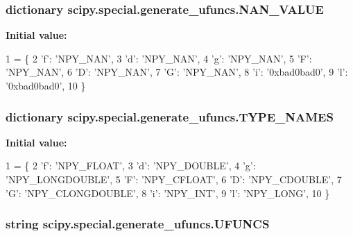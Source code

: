 \subsubsection[{N\+A\+N\+\_\+\+V\+A\+L\+U\+E}]{\setlength{\rightskip}{0pt plus 5cm}dictionary scipy.\+special.\+generate\+\_\+ufuncs.\+N\+A\+N\+\_\+\+V\+A\+L\+U\+E}\label{namespacescipy_1_1special_1_1generate__ufuncs_ae8498267d11764ae7751c668923040bf}
{\bfseries Initial value\+:}
\begin{DoxyCode}
1 = \{
2     \textcolor{stringliteral}{'f'}: \textcolor{stringliteral}{'NPY\_NAN'},
3     \textcolor{stringliteral}{'d'}: \textcolor{stringliteral}{'NPY\_NAN'},
4     \textcolor{stringliteral}{'g'}: \textcolor{stringliteral}{'NPY\_NAN'},
5     \textcolor{stringliteral}{'F'}: \textcolor{stringliteral}{'NPY\_NAN'},
6     \textcolor{stringliteral}{'D'}: \textcolor{stringliteral}{'NPY\_NAN'},
7     \textcolor{stringliteral}{'G'}: \textcolor{stringliteral}{'NPY\_NAN'},
8     \textcolor{stringliteral}{'i'}: \textcolor{stringliteral}{'0xbad0bad0'},
9     \textcolor{stringliteral}{'l'}: \textcolor{stringliteral}{'0xbad0bad0'},
10 \}
\end{DoxyCode}
\hypertarget{namespacescipy_1_1special_1_1generate__ufuncs_a800d81e3775d7c22733667b87973e576}{}
\subsubsection[{T\+Y\+P\+E\+\_\+\+N\+A\+M\+E\+S}]{\setlength{\rightskip}{0pt plus 5cm}dictionary scipy.\+special.\+generate\+\_\+ufuncs.\+T\+Y\+P\+E\+\_\+\+N\+A\+M\+E\+S}\label{namespacescipy_1_1special_1_1generate__ufuncs_a800d81e3775d7c22733667b87973e576}
{\bfseries Initial value\+:}
\begin{DoxyCode}
1 = \{
2     \textcolor{stringliteral}{'f'}: \textcolor{stringliteral}{'NPY\_FLOAT'},
3     \textcolor{stringliteral}{'d'}: \textcolor{stringliteral}{'NPY\_DOUBLE'},
4     \textcolor{stringliteral}{'g'}: \textcolor{stringliteral}{'NPY\_LONGDOUBLE'},
5     \textcolor{stringliteral}{'F'}: \textcolor{stringliteral}{'NPY\_CFLOAT'},
6     \textcolor{stringliteral}{'D'}: \textcolor{stringliteral}{'NPY\_CDOUBLE'},
7     \textcolor{stringliteral}{'G'}: \textcolor{stringliteral}{'NPY\_CLONGDOUBLE'},
8     \textcolor{stringliteral}{'i'}: \textcolor{stringliteral}{'NPY\_INT'},
9     \textcolor{stringliteral}{'l'}: \textcolor{stringliteral}{'NPY\_LONG'},
10 \}
\end{DoxyCode}
\hypertarget{namespacescipy_1_1special_1_1generate__ufuncs_a7d934652eb2f7492698636737a4c826c}{}
\subsubsection[{U\+F\+U\+N\+C\+S}]{\setlength{\rightskip}{0pt plus 5cm}string scipy.\+special.\+generate\+\_\+ufuncs.\+U\+F\+U\+N\+C\+S}\label{namespacescipy_1_1special_1_1generate__ufuncs_a7d934652eb2f7492698636737a4c826c}

